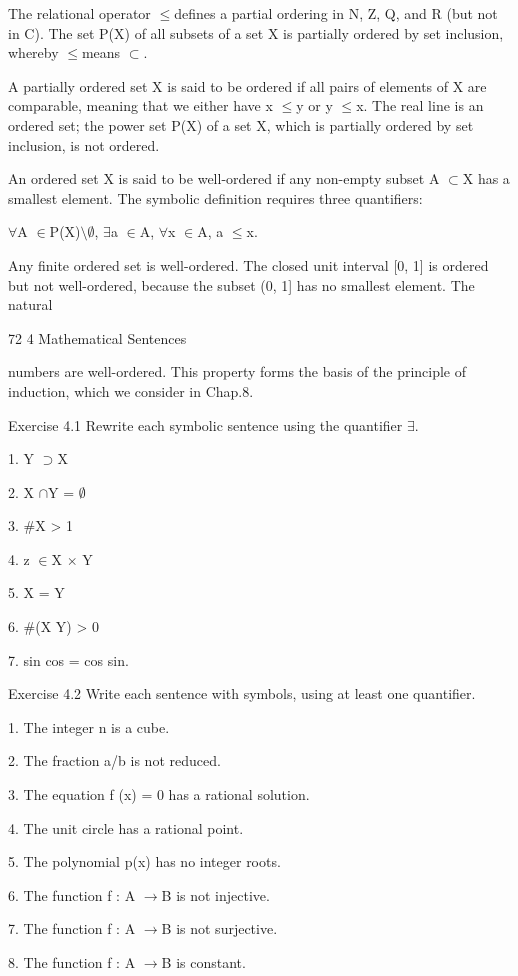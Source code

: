 \documentclass[11pt]{article}
\theoremstyle{plain}
\theoremstyle{definition}
\begin{document}
The relational operator $\leq$defines a partial ordering in N, Z, Q, and R (but not in C). The set P(X) of all subsets of a set X is partially ordered by set inclusion, whereby $\leq$means $\subset$.

A partially ordered set X is said to be ordered if all pairs of elements of X are comparable, meaning that we either have x $\leq$y or y $\leq$x. The real line is an ordered set; the power set P(X) of a set X, which is partially ordered by set inclusion, is not ordered.

An ordered set X is said to be well-ordered if any non-empty subset A $\subset$X has a smallest element. The symbolic definition requires three quantifiers:

$\forall$A $\in$P(X)$\setminus$$\emptyset$, $\exists$a $\in$A, $\forall$x $\in$A, a $\leq$x.

Any finite ordered set is well-ordered. The closed unit interval [0, 1] is ordered but not well-ordered, because the subset (0, 1] has no smallest element. The natural

72 4 Mathematical Sentences

numbers are well-ordered. This property forms the basis of the principle of induction, which we consider in Chap.8.

Exercise 4.1 Rewrite each symbolic sentence using the quantifier $\exists$.

1. Y $\supset$X

2. X $\cap$Y = $\emptyset$

3. \#X > 1

4. z $\in$X $\times$ Y

5. X = Y

6. \#(X Y) > 0

7. sin cos = cos sin.

Exercise 4.2 Write each sentence with symbols, using at least one quantifier.

1. The integer n is a cube.

2. The fraction a/b is not reduced.

3. The equation f (x) = 0 has a rational solution.

4. The unit circle has a rational point.

5. The polynomial p(x) has no integer roots.

6. The function f : A $\to$B is not injective.

7. The function f : A $\to$B is not surjective.

8. The function f : A $\to$B is constant.
\end{document}
